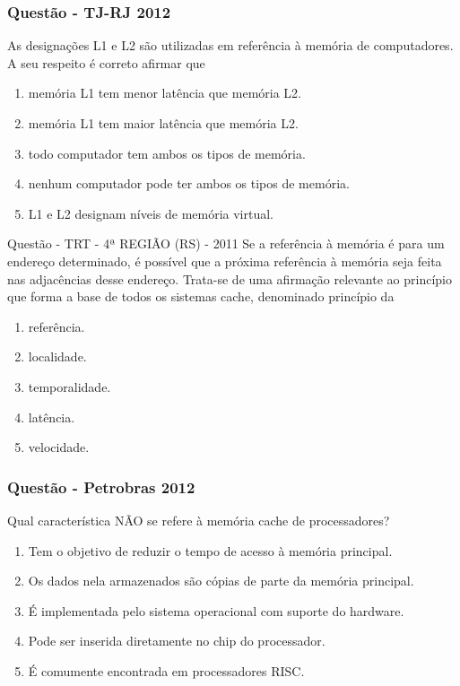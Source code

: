 \documentclass[aspectratio=169,
				xcolor=table]{beamer}
\begin{document}
	\begin{frame}
		\frametitle{Questão - TJ-RJ 2012}
		As designações L1 e L2 são utilizadas em referência à memória de computadores. A seu respeito é correto afirmar que 
		\begin{enumerate}[a]
			\large
			\item memória L1 tem menor latência que memória L2.
			\item memória L1 tem maior latência que memória L2.
			\item todo computador tem ambos os tipos de memória.
			\item nenhum computador pode ter ambos os tipos de memória.
			\item L1 e L2 designam níveis de memória virtual.
		\end{enumerate}
	\end{frame}

	\begin{frame}{Questão - TRT - 4ª REGIÃO (RS) - 2011 }
	Se a referência à memória é para um endereço determinado, é possível que a próxima referência à memória seja feita nas adjacências desse endereço. Trata-se de uma afirmação relevante ao princípio que forma a base de todos os sistemas cache, denominado princípio da 

	\begin{enumerate}[a]
		\item referência.
		\item localidade.
		\item temporalidade.
		\item latência.
		\item velocidade.	
	\end{enumerate}

	
	
	\end{frame}
	
	\begin{frame}
		\frametitle{Questão - Petrobras 2012}
		Qual característica NÃO se refere à memória cache de processadores?
		
		\begin{enumerate}[a]
			\large
			\item Tem o objetivo de reduzir o tempo de acesso à memória principal.
			\item Os dados nela armazenados são cópias de parte da memória principal.
			\item É implementada pelo sistema operacional com suporte do hardware.
			\item Pode ser inserida diretamente no chip do processador.
			\item É comumente encontrada em processadores RISC.
		\end{enumerate}
	\end{frame}
\end{document}
